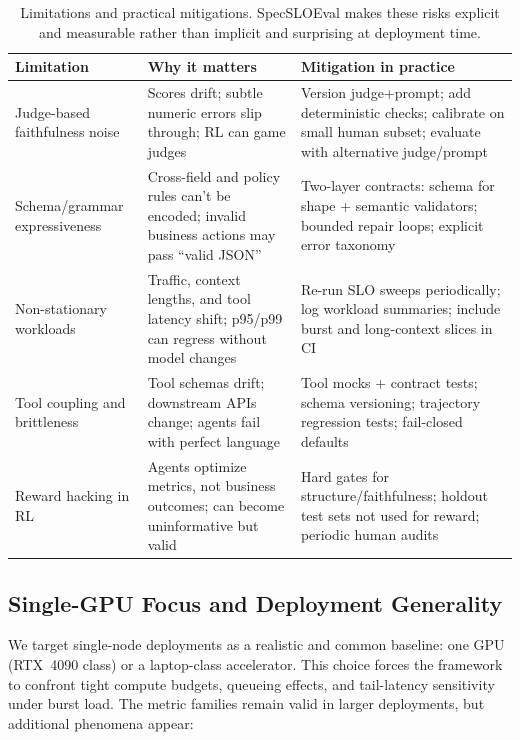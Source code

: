 \documentclass[11pt]{article}
\begin{document}
\begin{table}[t]
\centering
\small
\begin{tabular}{@{}p{3.3cm}p{5.4cm}p{5.4cm}@{}}
\toprule
\textbf{Limitation} & \textbf{Why it matters} & \textbf{Mitigation in practice} \\
\midrule
Judge-based faithfulness noise &
Scores drift; subtle numeric errors slip through; RL can game judges &
Version judge+prompt; add deterministic checks; calibrate on small human subset; evaluate with alternative judge/prompt \\
\addlinespace
Schema/grammar expressiveness &
Cross-field and policy rules can't be encoded; invalid business actions may pass ``valid JSON'' &
Two-layer contracts: schema for shape + semantic validators; bounded repair loops; explicit error taxonomy \\
\addlinespace
Non-stationary workloads &
Traffic, context lengths, and tool latency shift; p95/p99 can regress without model changes &
Re-run SLO sweeps periodically; log workload summaries; include burst and long-context slices in CI \\
\addlinespace
Tool coupling and brittleness &
Tool schemas drift; downstream APIs change; agents fail with perfect language &
Tool mocks + contract tests; schema versioning; trajectory regression tests; fail-closed defaults \\
\addlinespace
Reward hacking in RL &
Agents optimize metrics, not business outcomes; can become uninformative but valid &
Hard gates for structure/faithfulness; holdout test sets not used for reward; periodic human audits \\
\bottomrule
\end{tabular}
\caption{Limitations and practical mitigations.
SpecSLOEval makes these risks explicit and measurable rather than implicit and surprising at deployment time.}
\label{tab:limitations-mitigations}
\end{table}

\subsection{Single-GPU Focus and Deployment Generality}

We target single-node deployments as a realistic and common baseline: one GPU (RTX~4090 class) or a laptop-class accelerator.
This choice forces the framework to confront tight compute budgets, queueing effects, and tail-latency sensitivity under burst load.
The metric families remain valid in larger deployments, but additional phenomena appear:
\end{document}
